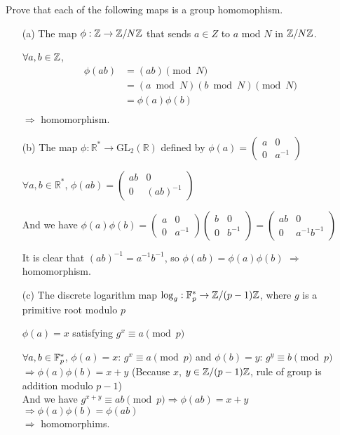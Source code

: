 \begin{exer}[2.14]
Prove that each of the following maps is a group homomophism.

\begin{enumerate}
    \item [(a)] The map $\phi: \mathbb{Z} \rightarrow \mathbb{Z}/N\mathbb{Z}$ that sends $a \in Z$ to $a$ mod $N$ in $\mathbb{Z}/N\mathbb{Z}$.
    
    $\forall a, b \in \mathbb{Z}$, 
    \begin{align*}
         \phi(ab) &= (ab) \pmod N\\
         &= (a \bmod N)(b \bmod N) \pmod N \\
         &= \phi(a)\phi(b) \\ 
    \end{align*}
   $\Rightarrow$ homomorphism.
    
    \item [(b)] The map $\phi: \mathbb{R}^* \rightarrow \text{GL}_2(\mathbb{R})$ defined by $\phi(a) = \begin{pmatrix}a & 0 \\ 0 & a^{-1}\end{pmatrix}$
    
    $\forall a, b \in \mathbb{R}^*$, $\phi(ab)=\begin{pmatrix}ab & 0 \\ 0 & (ab)^{-1}\end{pmatrix}$
    
    And we have $\phi(a)\phi(b) = \begin{pmatrix}a & 0 \\ 0 & a^{-1}\end{pmatrix}\begin{pmatrix}b & 0 \\ 0 & b^{-1}\end{pmatrix} = \begin{pmatrix}ab & 0 \\ 0 & a^{-1}b^{-1}\end{pmatrix}$
    
    It is clear that $(ab)^{-1} = a^{-1}b^{-1}$, so $\phi(ab) = \phi(a)\phi(b)$ $\Rightarrow$ homomorphism.
    
    \item [(c)] The discrete logarithm map $\log_g: \mathbb{F}_p^* \rightarrow \mathbb{Z}/(p-1)\mathbb{Z}$, where $g$ is a primitive root modulo $p$
    
    $\phi(a) = x$ satisfying $g^x \equiv a \pmod p$
    
    $\forall a, b \in \mathbb{F}_p^*$, $\phi(a) = x$: $g^x \equiv a \pmod p$ and $\phi(b) = y$: $g^y \equiv b \pmod p$ \\ $\Rightarrow \phi(a)\phi(b) = x+y$ (Because $x$, $y \in \mathbb{Z}/(p-1)\mathbb{Z}$, rule of group is addition modulo $p-1$) \\ And we have $g^{x+y} \equiv ab \pmod p \Rightarrow \phi(ab)=x+y$ \\ $\Rightarrow \phi(a)\phi(b) = \phi(ab)$ \\ $\Rightarrow$ homomorphims.
    \end{enumerate}
\end{exer}

